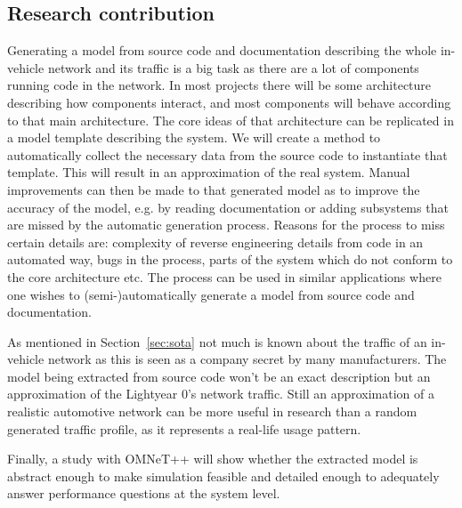 \subsection{Research contribution}
\label{sec:research_contribution}
Generating a model from source code and documentation describing the whole in-vehicle network and its traffic is a big task as there are a lot of components running code in the network. In most projects there will be some architecture describing how components interact, and most components will behave according to that main architecture. The core ideas of that architecture can be replicated in a model template describing the system. We will create a method to automatically collect the necessary data from the source code to instantiate that template. This will result in an approximation of the real system. Manual improvements can then be made to that generated model as to improve the accuracy of the model, e.g. by reading documentation or adding subsystems that are missed by the automatic generation process. Reasons for the process to miss certain details are: complexity of reverse engineering details from code in an automated way, bugs in the process, parts of the system which do not conform to the core architecture etc. The process can be used in similar applications where one wishes to (semi-)automatically generate a model from source code and documentation.

As mentioned in Section~\ref{sec:sota} not much is known about the traffic of an in-vehicle network as this is seen as a company secret by many manufacturers. The model being extracted from source code won't be an exact description but an approximation of the Lightyear 0's network traffic. Still an approximation of a realistic automotive network can be more useful in research than a random generated traffic profile, as it represents a real-life usage pattern. 

Finally, a study with OMNeT++ will show whether the extracted model is abstract enough to make simulation feasible and detailed enough to adequately answer performance questions at the system level.

